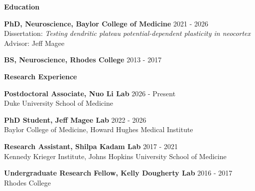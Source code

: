 \documentclass{resume} %
\begin{document}
\begin{rSection}{{\bfseries Education}}

    {\bfseries PhD, Neuroscience, Baylor College of Medicine} \hfill {2021 - 2026}
\\ Dissertation: \emph{Testing dendritic plateau potential-dependent plasticity in neocortex}
\\ Advisor: Jeff Magee \vspace{0.3\baselineskip}

    {\bfseries BS, Neuroscience, Rhodes College} \hfill {2013 - 2017}

\end{rSection}


\begin{rSection}{{\bfseries Research Experience}}
  
      {\bfseries Postdoctoral Associate, Nuo Li Lab} \hfill {2026 - Present}
    \\ Duke University School of Medicine \vspace{0.3\baselineskip}

    {\bfseries PhD Student, Jeff Magee Lab} \hfill {2022 - 2026}
    \\ Baylor College of Medicine, Howard Hughes Medical Institute \vspace{0.3\baselineskip}

    {\bfseries Research Assistant, Shilpa Kadam Lab} \hfill {2017 - 2021}
    \\ Kennedy Krieger Institute, Johns Hopkins University School of Medicine \vspace{0.3\baselineskip}

    {\bfseries Undergraduate Research Fellow, Kelly Dougherty Lab} \hfill {2016 - 2017}
    \\ Rhodes College
\end{rSection}
\end{document}
